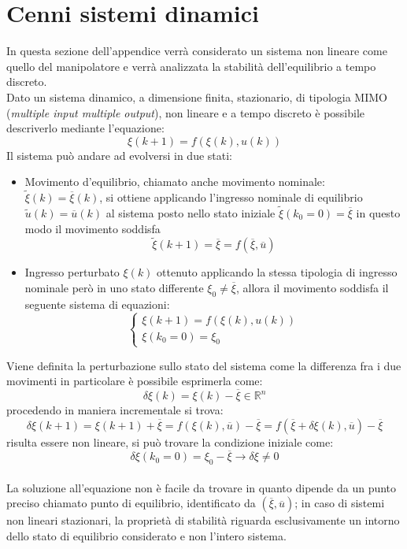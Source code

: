 \section{Cenni sistemi dinamici}
In questa sezione dell'appendice  verrà considerato un sistema non lineare come quello del manipolatore e verrà analizzata la stabilità dell'equilibrio a tempo discreto.
\\Dato un sistema dinamico, a dimensione finita, stazionario, di tipologia MIMO (\textit{multiple input multiple output}), non lineare e a tempo discreto è possibile descriverlo mediante l'equazione:
\begin{equation}
\xi(k+1) = f(\xi(k),u(k))
\end{equation}
Il sistema può andare ad evolversi in due stati:
\begin{itemize}
\item Movimento d'equilibrio, chiamato anche movimento nominale: $\tilde{\xi}(k) = \overline{\xi}(k)$, si ottiene applicando l'ingresso nominale di equilibrio $\tilde{u}(k) = \overline{u}(k)$ al sistema posto nello stato iniziale $\tilde{\xi}(k_0 = 0)=\overline{\xi}$ in questo modo il movimento soddisfa
\begin{equation}
\tilde{\xi}(k+1) = \overline{\xi} = f(\overline{\xi},\overline{u})
\end{equation}
\item Ingresso perturbato $\xi(k)$ ottenuto applicando la stessa tipologia di ingresso nominale però in uno stato differente $\xi_0 \neq \overline{\xi}$, allora il movimento soddisfa il seguente sistema di equazioni:
\begin{equation}
\begin{cases}
\xi(k+1) = f(\xi(k),u(k)) \\
\xi(k_0=0) = \xi_0
\end{cases}
\end{equation}
\end{itemize}
Viene definita la perturbazione sullo stato del sistema come la differenza fra i due movimenti in particolare è possibile esprimerla come:
\begin{equation}
\delta \xi(k) = \xi(k)-\overline{\xi} \in \mathbb{R}^n 
\end{equation}
procedendo in maniera incrementale si trova:
\begin{equation}
\delta \xi(k+1) = \xi(k+1)+\overline{\xi} = f(\xi(k),\overline{u})-\overline{\xi} = f(\overline{\xi}+\delta\xi(k),\overline{u})-\overline{\xi}
\end{equation}
risulta essere non lineare, si può trovare la condizione iniziale come:
\begin{equation*} 
\delta \xi(k_0 = 0) = \xi_0 -\overline{\xi} \rightarrow \delta \xi \neq 0
\end{equation*}
\\La soluzione all'equazione non è facile da trovare in quanto dipende da un punto preciso chiamato punto di equilibrio, identificato da $(\overline{\xi},\overline{u})$; in caso di sistemi non lineari stazionari, la proprietà di stabilità riguarda esclusivamente un intorno dello stato di equilibrio considerato e non l'intero sistema.

